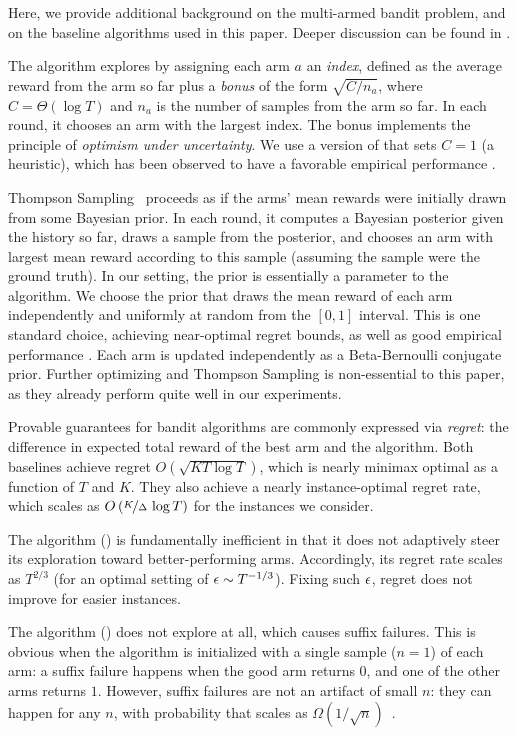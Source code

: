 Here, we provide additional background on the multi-armed bandit problem, and on the baseline algorithms used in this paper. Deeper discussion can be found in \citet{Bubeck-survey12,slivkins-MABbook,LS19bandit-book}.

The \ucb algorithm \citep{bandits-ucb1} explores by assigning each arm $a$ an \emph{index}, defined as the average reward from the arm so far plus a \emph{bonus} of the form $\sqrt{C/n_a}$, where $C = \Theta(\log T)$ and $n_a$ is the number of samples from the arm so far. In each round, it chooses an arm with the largest index. The bonus implements the principle of \emph{optimism under uncertainty}. We use a version of \ucb that sets $C=1$ (a heuristic), which has been observed to have a favorable empirical performance \citep[\eg][]{ZoomingRBA-icml10,RepeatedPA-ec14}.

Thompson Sampling~\citep[][for a survey]{Thompson-1933,TS-survey-FTML18} proceeds as if the arms' mean rewards were initially drawn from some Bayesian prior. In each round, it computes a Bayesian posterior given the history so far, draws a sample from the posterior, and chooses an arm with largest mean reward according to this sample (\ie assuming the sample were the ground truth).
In our setting, the prior is essentially a parameter to the algorithm. We choose the prior that draws the mean reward of each arm independently and uniformly at random from the $[0,1]$ interval. This is one standard choice, achieving near-optimal regret bounds, as well as good empirical performance \citep{Kaufmann-alt12,Shipra-colt12,Shipra-aistats13-JACM}. Each arm is updated independently as a Beta-Bernoulli conjugate prior. Further optimizing \ucb and Thompson Sampling is non-essential to this paper, as they already perform quite well in our experiments.

Provable guarantees for bandit algorithms are commonly expressed via \emph{regret}: the difference in expected total reward of the best arm and the algorithm. Both baselines achieve regret $O(\sqrt{KT\log T})$, which is nearly minimax optimal as a function of $T$ and $K$. They also achieve a nearly instance-optimal regret rate, which scales as $O\left(\nicefrac{K}{\Delta}\,\log T\right)$ for the instances we consider.

The \EpsGreedy algorithm () is fundamentally inefficient in that it does not adaptively steer its exploration toward better-performing arms. Accordingly, its regret rate scales as $T^{2/3}$ (for an optimal setting of $\epsilon\sim T^{-1/3}$). Fixing such $\epsilon$, regret does not improve for easier instances.

The \greedy algorithm () does not explore at all, which causes suffix failures. This is obvious when the algorithm is initialized with a single sample ($n=1$) of each arm: a suffix failure happens when the good arm returns $0$, and one of the other arms returns $1$. However, suffix failures are not an artifact of small $n$: they can happen for any $n$, with probability that scales as $\Omega(1/\sqrt{n})$~\citep{BSL-myopic23}.






